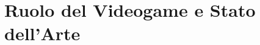 \chapter {Ruolo del Videogame e Stato dell'Arte}
\label{chap:gaming_layer}



\label{chap:stato_dell_arte}